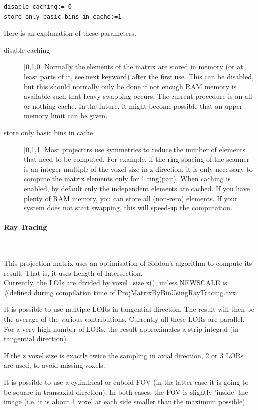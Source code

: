 \documentclass{article}
\newcommand{\subsubsubsection}[1]{\paragraph{#1}\mbox{} \\}
\begin{document}
{{\begin{verbatim}
disable caching:= 0
store only basic bins in cache:=1
\end{verbatim}

Here is an explanation of these parameters.

\begin{description}
\item[disable caching] [0,1,0{]}
Normally the elements of the matrix are stored in memory (or 
at least parts of it, see next keyword) after the first use. 
This can be disabled, but this should normally only be done if 
not enough RAM memory is available such that heavy swapping occurs. 
The current procedure is an all-or-nothing cache. In the future, 
it might become possible that an upper memory limit can be given.


\item[store only basic bins in cache] [0,1,1{]}
Most projectors use symmetries to reduce the number of elements 
that need to be computed. For example, if the ring spacing of 
the scanner is an integer multiple of the voxel size in z-direction, 
it is only necessary to compute the matrix elements only for 
1 ring(pair). When caching is enabled, by default only the independent 
elements are cached. If you have plenty of RAM memory, you can 
store all (non-zero) elements. If your system does not start 
swapping, this will speed-up the computation.
\end{description}

{ \subsubsubsection{Ray Tracing}
}
\label{sec:projmatrixusingraytracing}
This projection matrix uses an optimisation of Siddon's algorithm 
to compute its result. That is, it uses Length of Intersection.\\
Currently, the LOIs are divided by voxel\_size.x(), unless NEWSCALE 
is \#defined during compilation time of ProjMatrixByBinUsingRayTracing.cxx. 

It is possible to use multiple LORs in tangential direction. 
The result will then be the average of the various contributions. 
Currently all these LORs are parallel. For a very high number 
of LORs, the result approximates a strip integral (in tangential 
direction).

If the z voxel size is exactly twice the sampling in axial direction, 
2 or 3 LORs are used, to avoid missing voxels. 

It is possible to use a cylindrical or cuboid FOV (in the latter 
case it is going to be square in transaxial direction). In both 
cases, the FOV is slightly 'inside' the image (i.e. it is about 
1 voxel at each side smaller than the maximum possible).

}}
\end{document}
